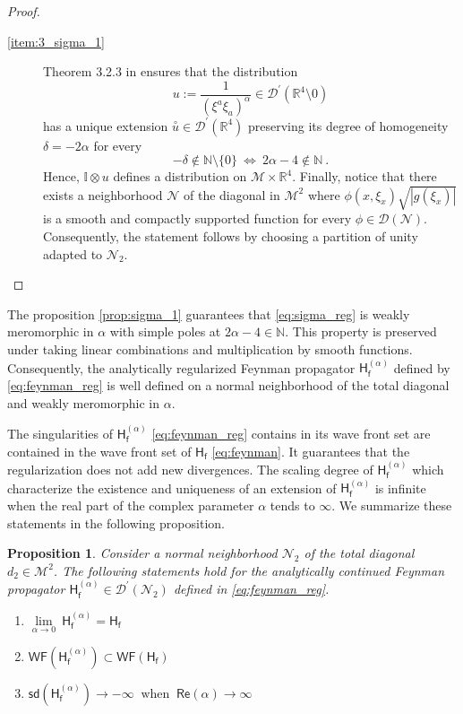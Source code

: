 \documentclass[11pt]{book}
\newcommand{\hilight}[1]{\colorbox{yellow!80!black}{#1}}
\newcommand{\WF}{\mathsf{WF}}
\newcommand{\sd}{\mathsf{sd}}
\renewcommand{\Re}{\mathsf{Re}}
\newcommand{\abs}[1]{\left|#1\right|}
\newcommand{\exte}[1]{\overset{\circ}{#1}}
\newcommand{\Dcal}{\mathcal{D}}
\newcommand{\Mcal}{\mathcal{M}}
\newcommand{\Ncal}{\mathcal{N}}
\newcommand{\Ibb}{\mathbb{I}}
\newcommand{\Nbb}{\mathbb{N}}
\newcommand{\Rbb}{\mathbb{R}}
\newcommand{\Hsf}{\mathsf{H}}
\newcommand{\fsf}{\mathsf{f}}
\theoremstyle{break}
\newtheorem{proposition}{Proposition}[chapter]
\begin{document}
\begin{proof}
\begin{description}
\item[\ref{item:3_sigma_1}] Theorem 3.2.3 in \cite{hormander_analysis_1990} ensures that the distribution 
%
\begin{equation*}
u := \frac{1}{(\xi^{a}{\xi}_{a})^\alpha} \in\Dcal^\prime(\Rbb^4\setminus  0) 
\end{equation*}
%
has a unique extension $\exte{u} \in \Dcal^\prime(\Rbb^4)$ preserving its degree of homogeneity $\delta=-2\alpha$ for every 
%
\begin{equation*}
-\delta\notin\Nbb\setminus\{0\} \ \Leftrightarrow \ 2\alpha-4 \notin \Nbb \ .
\end{equation*}
%
Hence, $\Ibb\otimes u$ defines a distribution on $\Mcal \times \Rbb^4$.
Finally, notice that there exists a neighborhood $\Ncal$ of the diagonal in $\Mcal^2$
where $\phi(x,\xi_x) \sqrt{\abs{g(\xi_x)}}$ is a smooth and compactly supported function for every $\phi\in \Dcal(\Ncal)$. Consequently, the statement follows by choosing a partition of unity adapted to $\Ncal_2$.
\end{description}
%
\end{proof}


The proposition \ref{prop:sigma_1} guarantees that \eqref{eq:sigma_reg} is weakly meromorphic in $\alpha$ with simple poles at $2\alpha-4\in\Nbb$. This property is preserved under taking linear combinations and multiplication by smooth functions. Consequently, the analytically regularized Feynman propagator $\Hsf^{(\alpha)}_\fsf$ defined by \eqref{eq:feynman_reg} is well defined on a normal neighborhood of the total diagonal and weakly meromorphic in $\alpha$. 


The singularities of $\Hsf^{(\alpha)}_\fsf$ \eqref{eq:feynman_reg} contains in its wave front set are contained in the wave front set of $\Hsf_\fsf$ \eqref{eq:feynman}. It guarantees that the regularization does not add new divergences. The scaling degree of $\Hsf^{(\alpha)}_\fsf$  which characterize the existence and uniqueness of an extension of $\Hsf^{(\alpha)}_\fsf$ is infinite when the real part of the complex parameter $\alpha$ tends to $\infty$. We summarize these statements in the following proposition.


\begin{proposition}\label{prop:wf_h_reg}
Consider a normal neighborhood $\Ncal_2$ of the total diagonal $d_2\in\Mcal^2$. The following statements hold for the analytically continued Feynman propagator $\Hsf^{(\alpha)}_\fsf\in\Dcal^\prime(\Ncal_2)$ defined in \eqref{eq:feynman_reg}.
%
\begin{enumerate}
\item\label{item:1_wf_h_reg} $\underset{\alpha \to 0}{\lim} \ \Hsf^{(\alpha)}_\fsf = \Hsf_\fsf$
%
\item\label{item:2_wf_h_reg} $\WF\left(\Hsf^{(\alpha)}_\fsf\right) \subset \WF\left(\Hsf_\fsf\right)$
%
\item\label{item:3_wf_h_reg} \hilight{$\sd\left(\Hsf^{(\alpha)}_\fsf\right) \to - \infty \ \mbox{ when } \ \Re\left(\alpha\right) \to \infty$}
\end{enumerate}
%
\end{proposition}
\end{document}
